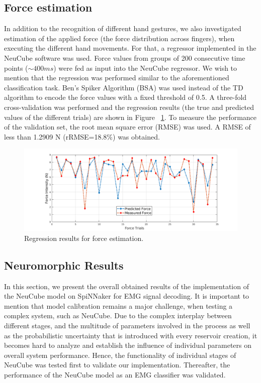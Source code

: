 \documentclass[journal,article,submit,moreauthors,pdftex,10pt,a4paper]{Definitions/mdpi}
\begin{document}
\subsection{Force estimation}
In addition to the recognition of different hand gestures, we also investigated  estimation of the applied force (the force distribution across fingers), when executing the different hand movements. For that, a regressor implemented in the NeuCube software was used. 
Force values from groups of 200 consecutive time points ($\sim 400 ms$) were fed as input into the NeuCube regressor. We wish to mention that the regression was performed similar to the aforementioned classification task. Ben’s Spiker Algorithm (BSA) \cite{37} was used instead of the TD algorithm to encode the force values with a fixed threshold of 0.5. A three-fold cross-validation was performed and the regression results (the true and predicted values of the different trials) are shown in Figure ~\ref{FIG:ForceFigure1.png}. To measure the performance of the validation set, the root mean square error (RMSE)
was used. A RMSE of less than 1.2909 N (rRMSE=18.8\%) was obtained. 
\begin{figure}[ht]
    \centering
    \includegraphics [width=\textwidth]{ForceFigure1.png}
    \caption{Regression results for force estimation.
}
    \label{FIG:ForceFigure1.png}
\end{figure}

\subsection{Neuromorphic Results}
In this section, we present the overall obtained results of the implementation of the NeuCube model on SpiNNaker for EMG signal decoding. It is important to mention that model calibration remains a major challenge, when testing  a complex system, such as NeuCube. Due to the complex interplay between different stages, and the multitude of parameters involved in the process as well as the probabilistic uncertainty that is introduced with every reservoir creation, it becomes hard to analyze and establish the influence of individual parameters on overall system performance. Hence, the functionality of individual stages of NeuCube was tested first to validate our implementation. Thereafter, the performance of the NeuCube model as an EMG classifier was validated.
\end{document}
